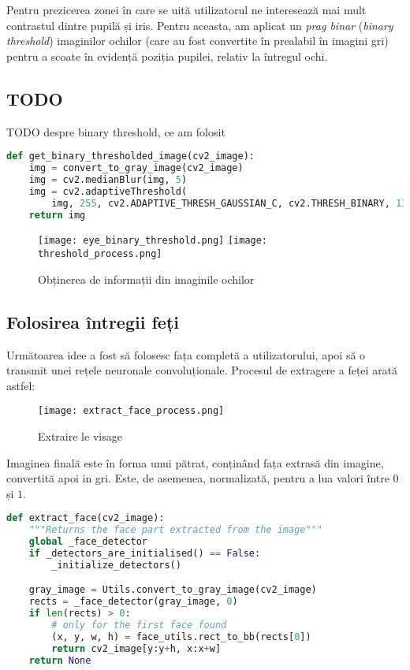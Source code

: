 Pentru prezicerea zonei în care se uită utilizatorul ne interesează mai mult contrastul dintre pupilă și iris.
Pentru aceasta, am aplicat un \emph{prag binar} (\emph{binary threshold}) imaginilor ochilor (care au fost convertite în prealabil în imagini gri) pentru a scoate în evidență poziția pupilei, relativ la întregul ochi.

\subsection{TODO}
TODO despre binary threshold, ce am folosit

\begin{lstlisting}[language=Python, caption=Aplicarea unui \emph{binary threshold}]
def get_binary_thresholded_image(cv2_image):
    img = convert_to_gray_image(cv2_image)
    img = cv2.medianBlur(img, 5)
    img = cv2.adaptiveThreshold(
        img, 255, cv2.ADAPTIVE_THRESH_GAUSSIAN_C, cv2.THRESH_BINARY, 11, 2)
    return img
\end{lstlisting}

\begin{figure}[h]
    \centering
    \texttt{[image: eye\_binary\_threshold.png]}
    \texttt{[image: threshold\_process.png]}
    \caption{Obținerea de informații din imaginile ochilor}
\end{figure}

\subsection{Folosirea întregii feți}
Următoarea idee a fost să folosesc fața completă a utilizatorului, apoi să o transmit unei rețele neuronale convoluționale.
Procesul de extragere a feței arată astfel:

\begin{figure}[h]
    \centering
    \texttt{[image: extract\_face\_process.png]}
    \caption{Extraire le visage}
    \label{fig_extracted_faces}
\end{figure}

Imaginea finală este în forma unui pătrat, conținând fața extrasă din imagine, convertită apoi in gri.
Este, de asemenea, normalizată, pentru a lua valori între $0$ și $1$.

\begin{lstlisting}[language=Python, caption=Extragerea feței dintr-o imagine]
def extract_face(cv2_image):
    """Returns the face part extracted from the image"""
    global _face_detector
    if _detectors_are_initialised() == False:
        _initialize_detectors()

    gray_image = Utils.convert_to_gray_image(cv2_image)
    rects = _face_detector(gray_image, 0)
    if len(rects) > 0:
        # only for the first face found
        (x, y, w, h) = face_utils.rect_to_bb(rects[0])
        return cv2_image[y:y+h, x:x+w]
    return None
\end{lstlisting}


